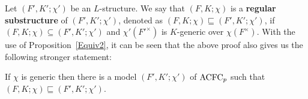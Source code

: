 \noindent
Let $(F', K';\chi')$ be an $L$-structure. We say that $(F, K; \chi)$ is a {\bf regular substructure} of $(F', K';\chi')$, denoted as  $(F, K; \chi) \sqsubseteq (F', K';\chi')$,  if  $(F, K; \chi) \subseteq (F', K';\chi')$ and $\chi'( {F'}^\times)$ is $K$-generic over $\chi( F^\times)$. With the use of Proposition~\ref{Equiv2}, it can be seen that the above proof also gives us the following stronger statement:

\begin{cor}\label{Substructures2}
If $\chi$  is generic then there is a model $(F', K'; \chi')$ of $\mathrm{ACFC}_p$ such that 
$(F, K; \chi) \sqsubseteq (F', K';\chi')$.
\end{cor}


\begin{comment}

\begin{prop}\label{Substructures}

Let $(R, A; \chi)$ be an $\Lprc$-structure where $R$ and $A$ are integral domains and $\chi$ is a reduction of a generic character between $Frac(R)$ and $Frac(A)$. Then $(R, A; \chi)\models \TNp(\forall)$.
\end{prop}

\begin{proof}


Denote $F=Frac(R)$ and $K=Frac(A)$. 
So we can assume that we have a character $\chi:F\to K$. $(F,K;\chi)$ still satisfies to the condition of the proposition. So it is enough to prove the statement for this structure. We will find a suitable model of $\TNp$ which contains $(F,K;\chi)$ as a substructure. We can choose $L\supseteq K$ a very big algebraically closed field, such that $trdeg(L|K(\chi(F)))>|F^{ac}|$.

Let $S$ be the set of $(F',\rho)$'s, where $F'$ is a multiplicative subgroup of $(F^{ac})^{\times}$ containing $F$ and $\rho:F'\to L$ is a generic character.
We also introduce a partial order on $S$ as $(F'_1,\rho_1)<(F'_2,\rho_2)$ if and only if $F'_1\subseteqeq F'_2$ and $\rho_2\res_{F'_1}=\rho_1$.
As $S$ is not empty because it contains $(F^{\times},\chi)$, by Zorn's lemma we can easily induce that $S$ has a maximal element. 
Let $(E,\rho)$ be a maximal element in $S$. We claim that $E=(F^{ac})^{\times}$. Assume $E\neq F^{ac}$. Take an element $f\in F^{ac}\setminus E$ and consider the group generated by $E$ and $f$. The following cases are possible:

Case 1: the element $f$ is multiplicatively independent from $E$.
In this case, we take an extension of $\rho$, by mapping $f$ to a transcendental element over $K(\rho(E))$.
Then, also define $\rho(f^{-1})=(\rho(f))^{-1}$.
This is possible by our assumptions on $L$. This will give us an element in $S$, thus, giving a contradiction.


\end{comment}

